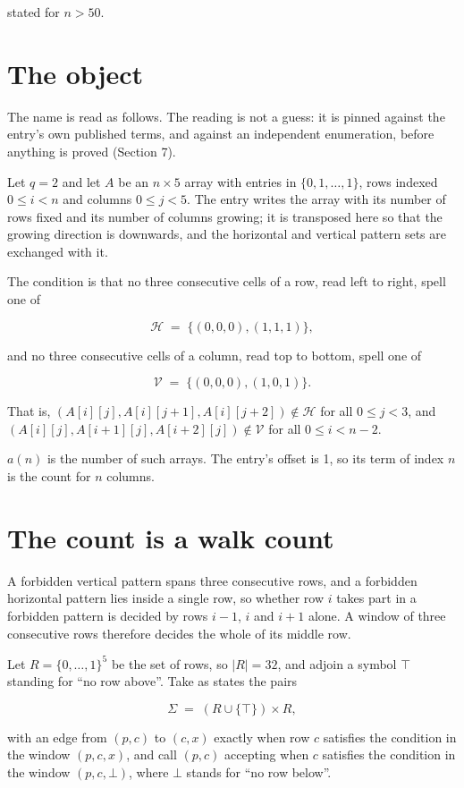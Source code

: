 \documentclass[11pt]{article}
\theoremstyle{definition}
\begin{document}
stated for $n > 50$.

\section{The object}

The name is read as follows. The reading is not a guess: it is pinned against the entry's own published terms, and against an independent enumeration, before anything is proved (Section 7).

Let $q = 2$ and let $A$ be an $n \times 5$ array with entries in $\{0,1,\dots,1\}$, rows indexed $0 \le i < n$ and columns $0 \le j < 5$. The entry writes the array with its number of rows fixed and its number of columns growing; it is transposed here so that the growing direction is downwards, and the horizontal and vertical pattern sets are exchanged with it.

The condition is that no three consecutive cells of a row, read left to right, spell one of

\[\mathcal{H} \;=\; \{(0,0,0), (1,1,1)\},\]

and no three consecutive cells of a column, read top to bottom, spell one of

\[\mathcal{V} \;=\; \{(0,0,0), (1,0,1)\}.\]

That is, $(A[i][j],A[i][j{+}1],A[i][j{+}2]) \notin \mathcal{H}$ for all $0 \le j < 3$, and $(A[i][j],A[i{+}1][j],A[i{+}2][j]) \notin \mathcal{V}$ for all $0 \le i < n-2$.

$a(n)$ is the number of such arrays. The entry's offset is 1, so its term of index $n$ is the count for $n$ columns.

\section{The count is a walk count}

A forbidden vertical pattern spans three consecutive rows, and a forbidden horizontal pattern lies inside a single row, so whether row $i$ takes part in a forbidden pattern is decided by rows $i-1$, $i$ and $i+1$ alone. A window of three consecutive rows therefore decides the whole of its middle row.

Let $R = \{0,\dots,1\}^{5}$ be the set of rows, so $|R| = 32$, and adjoin a symbol $\top$ standing for ``no row above''. Take as states the pairs

\[\Sigma \;=\; (R \cup \{\top\}) \times R,\]

with an edge from $(p,c)$ to $(c,x)$ exactly when row $c$ satisfies the condition in the window $(p,c,x)$, and call $(p,c)$ accepting when $c$ satisfies the condition in the window $(p,c,\bot)$, where $\bot$ stands for ``no row below''.
\end{document}
